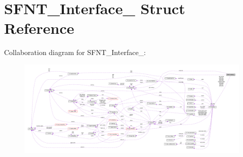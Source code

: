\hypertarget{structSFNT__Interface__}{}\section{S\+F\+N\+T\+\_\+\+Interface\+\_\+ Struct Reference}
\label{structSFNT__Interface__}


Collaboration diagram for S\+F\+N\+T\+\_\+\+Interface\+\_\+\+:
\nopagebreak
\begin{figure}[H]
\begin{center}
\leavevmode
\includegraphics[width=350pt]{structSFNT__Interface____coll__graph}
\end{center}
\end{figure}

